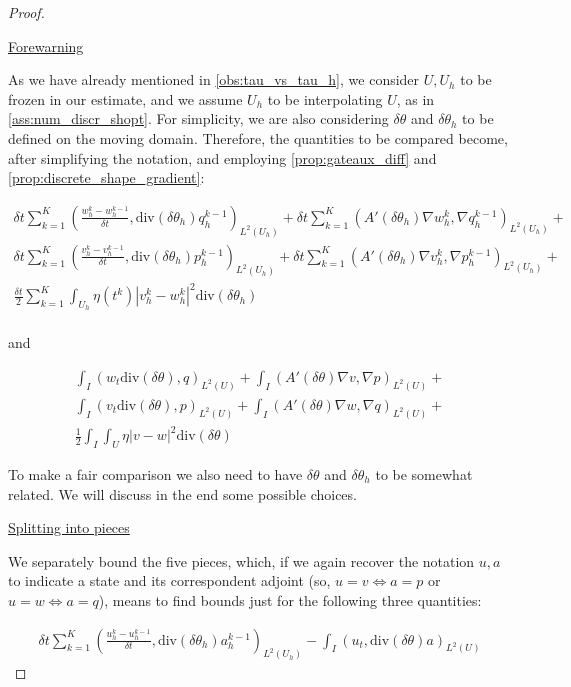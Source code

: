 \documentclass[english,a4paper,9pt,oneside]{scrbook}	%
\theoremstyle{break}
\newenvironment{mproof}[1][\proofname]{%
  \begin{proof}[#1]$ $\par\nobreak\ignorespaces
}{%
  \end{proof}
}
\renewcommand*{\proofname}{Proof}
\theoremstyle{remark}
\newcommand{\te}{\theta}
\newcommand{\dive}{\text{div}}
\begin{document}
\begin{mproof}

\underline{Forewarning}

As we have already mentioned in \cref{obs:tau_vs_tau_h}, we consider $U, U_h$ to be frozen in our estimate, and we assume $U_h$ to be interpolating $U$, as in \cref{ass:num_discr_shopt}. For simplicity, we are also considering $\delta \theta$ and $\delta \theta_h$ to be defined on the moving domain. Therefore, the quantities to be compared become, after simplifying the notation, and employing \cref{prop:gateaux_diff} and \cref{prop:discrete_shape_gradient}:

\begin{align*}
	\delta t \sum_{k=1}^{K} \left (\frac{w_h^{k}-w_h^{k-1}}{\delta t}, \dive(\delta \theta_h ) q_h^{k-1} \right )_{L^2(U_h)} + \delta t \sum_{k=1}^{K} (A'(\delta \theta_h ) \nabla w_h^k, \nabla q_h^{k-1})_{L^2(U_h)}+\\
	\delta t \sum_{k=1}^{K} \left (\frac{v_h^{k}-v_h^{k-1}}{\delta t}, \dive(\delta \theta_h ) p_h^{k-1} \right )_{L^2(U_h)} + \delta t \sum_{k=1}^{K} (A'(\delta \theta_h) \nabla v_h^k, \nabla p_h^{k-1})_{L^2(U_h)}+\\
	\frac{\delta t}{2} \sum_{k=1}^{K} \int_{U_h} \eta(t^k)|v_h^k-w_h^k|^2  \dive(\delta \theta_h )\\
\end{align*}

and

\begin{align*}
	\int_I (w_t \dive(\delta \te), q)_{L^2(U)}+ \int_I (A'(\delta\te )\nabla v, \nabla p)_{L^2(U)}+\\
\int_I (v_t\dive(\delta \te), p)_{L^2(U)}+ \int_I (A'(\delta\te )\nabla w, \nabla q)_{L^2(U)}+\\
\frac{1}{2}\int_I\int_{U}\eta |v-w|^2\dive(\delta \te)
\end{align*}

To make a fair comparison we also need to have $\delta \te $ and $\delta \te_h$ to be somewhat related. We will discuss in the end some possible choices.

\underline{Splitting into pieces}

We separately bound the five pieces, which, if we again recover the notation $u, a$ to indicate a state and its correspondent adjoint (so, $u=v \iff a = p$ or $u=w \iff a = q$), means to find bounds just for the following three quantities:

\begin{align*}
	\delta t \sum_{k=1}^{K} \left (\frac{u_h^{k}-u_h^{k-1}}{\delta t}, \dive(\delta \theta_h ) a_h^{k-1} \right )_{L^2(U_h)}  - \int_I (u_t , \dive(\delta \te) a)_{L^2(U)}
\end{align*}


\end{mproof}
\end{document}
